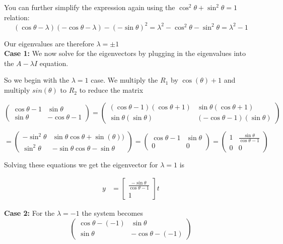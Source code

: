 \documentclass[8pt]{article}
\begin{document}
{You can further simplify the expression again using the $ \cos ^{2} \theta + \sin ^{2} \theta = 1$ relation:
$$
(\cos \theta - \lambda) (-\cos \theta - \lambda) - (-\sin \theta)^{2} = \lambda ^{2} - \cos ^{2} \theta - \sin ^{2} \theta = \lambda ^{2} -1
$$

Our eigenvalues are therefore $\lambda = \pm 1$ \\

\textbf{Case 1: }We now solve for the eigenvectors by plugging in the eigenvalues into the $A- \lambda I$ equation. 

So we begin with the $\lambda=1$ case. We multiply the $R_1$ by $\cos(\theta) +1$ and multiply $sin(\theta)$ to $R_2$ to reduce the matrix

$$
\begin{pmatrix}
\cos \theta -1 & \sin \theta \\
\sin \theta & -\cos \theta - 1
\end{pmatrix} = 
\begin{pmatrix}
(\cos \theta -1)(\cos \theta +1) & \sin \theta (\cos \theta +1)\\
\sin \theta (\sin \theta) & (-\cos \theta -1)(\sin \theta)
\end{pmatrix} 
$$

$$
= \begin{pmatrix}
-\sin^2 \theta & \sin \theta \cos \theta + \sin(\theta))\\
\sin^2 \theta & -\sin \theta\cos \theta -\sin \theta
\end{pmatrix} =
\begin{pmatrix}
\cos \theta -1 & \sin \theta \\
0 & 0
\end{pmatrix} = 
\begin{pmatrix}
1 & \frac{\sin \theta}{\cos \theta -1} \\
0 & 0
\end{pmatrix}
$$

Solving these equations we get the eigenvector for $\lambda =1$ is 

\begin{align}
    y &= \begin{bmatrix}
           \frac{-\sin \theta }{\cos \theta -1} \\
           1
         \end{bmatrix}t 
\end{align}

\textbf{Case 2: }For the $\lambda =-1$ the system becomes
$$
\begin{pmatrix}
\cos \theta - (-1) & \sin \theta \\
\sin \theta & -\cos \theta -  (-1)
\end{pmatrix} 
$$

}
\end{document}
